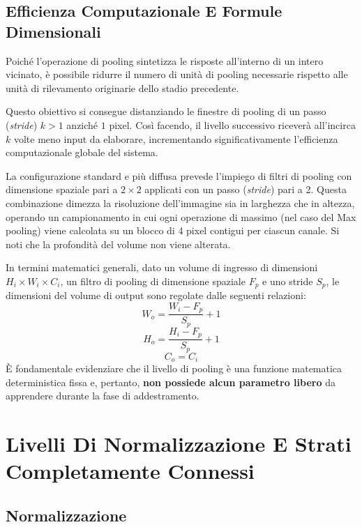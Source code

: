 ﻿\documentclass[11pt, a4paper]{article}
\begin{document}
\subsection{Efficienza Computazionale E Formule Dimensionali}

Poiché l'operazione di pooling sintetizza le risposte all'interno di un intero vicinato, è possibile ridurre il numero di unità di pooling necessarie rispetto alle unità di rilevamento originarie dello stadio precedente.


Questo obiettivo si consegue distanziando le finestre di pooling di un passo (\emph{stride}) $k > 1$ anziché $1$ pixel. Così facendo, il livello successivo riceverà all'incirca $k$ volte meno input da elaborare, incrementando significativamente l'efficienza computazionale globale del sistema.

La configurazione standard e più diffusa prevede l'impiego di filtri di pooling con dimensione spaziale pari a $2 \times 2$ applicati con un passo (\emph{stride}) pari a 2. Questa combinazione dimezza la risoluzione dell'immagine sia in larghezza che in altezza, operando un campionamento in cui ogni operazione di massimo (nel caso del Max pooling) viene calcolata su un blocco di 4 pixel contigui per ciascun canale. Si noti che la profondità del volume non viene alterata.

In termini matematici generali, dato un volume di ingresso di dimensioni $H_i \times W_i \times C_i$, un filtro di pooling di dimensione spaziale $F_p$ e uno stride $S_p$, le dimensioni del volume di output sono regolate dalle seguenti relazioni:
\[
\boxed{W_o = \frac{W_i - F_p}{S_p} + 1}
\]
\[
\boxed{H_o = \frac{H_i - F_p}{S_p} + 1}
\]
\[
\boxed{C_o = C_i}
\]
È fondamentale evidenziare che il livello di pooling è una funzione matematica deterministica fissa e, pertanto, \textbf{non possiede alcun parametro libero} da apprendere durante la fase di addestramento.

\newpage

\section{Livelli Di Normalizzazione E Strati Completamente Connessi}

\subsection{Normalizzazione}
\end{document}
